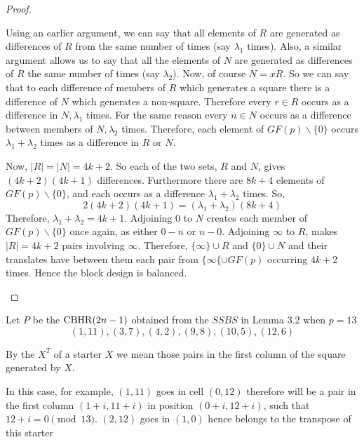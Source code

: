 \begin{proof}
\begin{enumerate}
{    Using an earlier argument, we can say that
    all elements of $R$ are generated as differences of $R$
    from the same number of times (say $\lambda _1$ times).
    Also, a similar argument allows us to say that all the
    elements of $N$ are generated as differences of $R$ the
    same number of times (say $\lambda _2$). Now, of course
    $N = xR$. So we can say that to each difference of
    members of $R$ which generates a square there is a
    difference of $N$ which generates a non-square.
    Therefore every $r \in R$ occurs as a difference in
    $N, \lambda _1$ times. For the same reason every
    $n \in N$ occurs as a difference between members of
    $N, \lambda _2$ times. Therefore, each element of
    $GF(p) \backslash \{0\}$ occurs $\lambda _1 + \lambda _2$
    times as a difference in $R$ or $N$.
    
    Now, $|R| = |N| = 4k + 2$. So each of the two sets, $R$
    and $N$, gives $(4k + 2)(4k + 1)$ differences. Furthermore
    there are $8k + 4$ elements of $GF(p) \backslash \{0\}$,
    and each occurs as a difference
    $\lambda _1 + \lambda _2$ times. So,
    \begin{equation}
    2(4k + 2)(4k + 1) = (\lambda _1 + \lambda _2)(8k + 4)
    \end{equation}
    Therefore, $\lambda _1 + \lambda _2 = 4k + 1$.
    Adjoining 0 to $N$ creates each member of
    $GF(p) \backslash \{0\}$ once again, as either $0-n$ or
    $n-0$.
    Adjoining $\infty$ to $R$, makes $|R| = 4k + 2$ pairs
    involving $\infty$. Therefore, $\{\infty\} \cup R$ and
    $\{0\} \cup N$ and their translates have between them
    each pair from $\{\infty\{ \cup GF(p)$ occurring $4k + 2$
    times. Hence the block design is balanced.}
\end{enumerate}
\end{proof}

\begin{example}
Let $P$ be the $\operatorname{CBHR}(2n - 1)$ obtained from the $SSBS$ in Lemma 3.2 when $p = 13$
\begin{equation}
  (1, 11), (3, 7), (4, 2), (9, 8), (10, 5), (12, 6)
\end{equation}
\end{example}

By the  $X^T$ of a starter $X$ we mean those pairs in the first column of the square generated by $X$.

In this case, for example, $(1, 11)$ goes in cell $(0, 12)$ therefore will be a pair in the first column $(1 + i, 11 + i)$ in position $(0 + i, 12 + i)$, such that $12 + i = 0\pmod{13}$. $(2, 12)$ goes in $(1, 0)$ hence belongs to the transpose of this starter

